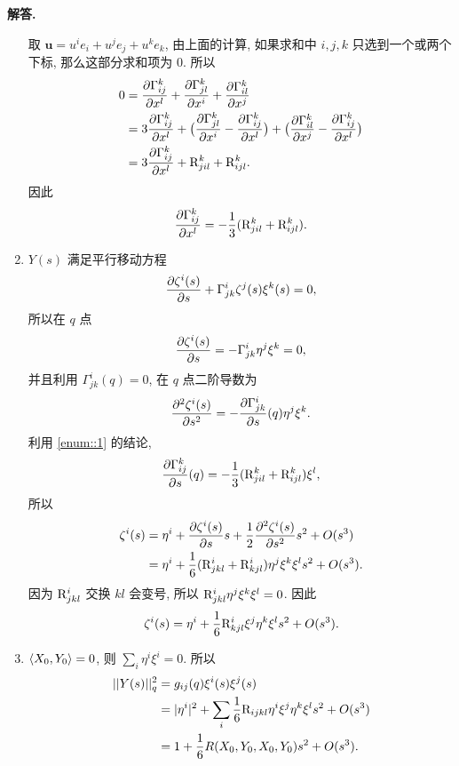 \documentclass{ctexart}
\newenvironment{solution}{\par\noindent\textbf{解答. }}{\par}
\begin{document}
\begin{solution}
\begin{enumerate}[label = (\roman*)]
        取 $\mathbf{u} = u^i e_i + u^j e_j + u^k e_k$, 由上面的计算, 如果求和中 $i, j, k$ 只选到一个或两个下标, 那么这部分求和项为 $0$. 所以
        \[
            \begin{aligned}
                0 ={} & \dfrac{\partial \Gamma^{k}_{ij}}{\partial x^l} + \dfrac{\partial \Gamma^{k}_{jl}}{\partial x^i} + \dfrac{\partial \Gamma^{k}_{il}}{\partial x^j} \\
                ={} & 3\dfrac{\partial \Gamma^{k}_{ij}}{\partial x^l} + \bigl( \dfrac{\partial \Gamma^{k}_{jl}}{\partial x^i} - \dfrac{\partial \Gamma^{k}_{ij}}{\partial x^l} \bigr) + \bigl( \dfrac{\partial \Gamma^{k}_{il}}{\partial x^j} - \dfrac{\partial \Gamma^{k}_{ij}}{\partial x^l} \bigr) \\
                ={} & 3\dfrac{\partial \Gamma^{k}_{ij}}{\partial x^l} + \mathrm{R}^{k}_{jil} + \mathrm{R}^{k}_{ijl}.
            \end{aligned}
        \]
        因此
        \[
            \dfrac{\partial \Gamma^{k}_{ij}}{\partial x^l} = -\dfrac{1}{3}(\mathrm{R}^{k}_{jil} + \mathrm{R}^{k}_{ijl}).
        \]
        \item $Y(s)$ 满足平行移动方程
        \[
            \dfrac{\partial \zeta^i(s)}{\partial s} + \Gamma^{i}_{jk} \zeta^j(s) \xi^k(s) = 0,
        \]
        所以在 $q$ 点
        \[
            \dfrac{\partial \zeta^i(s)}{\partial s} = -\Gamma^{i}_{jk} \eta^j \xi^k = 0,
        \]
        并且利用 $\Gamma^i_{jk}(q) = 0$, 在 $q$ 点二阶导数为
        \[
            \dfrac{\partial ^2 \zeta^i(s)}{\partial s^2} = -\dfrac{\partial \Gamma^{i}_{jk}}{\partial s}(q) \eta^j \xi^k.
        \]
        利用 \ref{enum::1} 的结论,
        \[
            \dfrac{\partial \Gamma^{k}_{ij}}{\partial s}(q) = -\dfrac{1}{3}(\mathrm{R}^{k}_{jil} + \mathrm{R}^{k}_{ijl})\xi^l,
        \]
        所以
        \[
            \begin{aligned}
                \zeta^i(s) ={} & \eta^i + \dfrac{\partial \zeta^i(s)}{\partial s} s + \dfrac{1}{2}\dfrac{\partial ^2 \zeta^i(s)}{\partial s^2} s^2 + O(s^3) \\
                ={} & \eta^i + \dfrac{1}{6}(\mathrm{R}^i_{jkl} + \mathrm{R}^i_{kjl}) \eta^j \xi^k \xi^l s^2 + O(s^3).
            \end{aligned}
        \]
        因为 $\mathrm{R}^i_{jkl}$ 交换 $kl$ 会变号, 所以 $\mathrm{R}^i_{jkl}\eta^j \xi^k \xi^l = 0$. 因此
        \[
            \zeta^i(s) = \eta^i + \dfrac{1}{6}\mathrm{R}^i_{kjl} \xi^j \eta^k \xi^l s^2 + O(s^3).
        \]
        \item $\langle {X_0}, {Y_0} \rangle = 0$, 则 $\sum_{i} \eta^i \xi^i = 0$.
        所以
        \[
            \begin{aligned}
                ||Y(s)||^2_q ={} & g_{ij}(q)\xi^i(s) \xi^j(s) \\
                ={} & |\eta^i|^2 + \sum_{i}\dfrac{1}{6}\mathrm{R}_{ijkl} \eta^i \xi^j \eta^k \xi^l s^2 + O(s^3) \\
                ={} & 1 + \dfrac{1}{6}R(X_0, Y_0, X_0, Y_0)s^2 + O(s^3).
            \end{aligned}
        \]
    \end{enumerate}
\end{solution}
\end{document}
